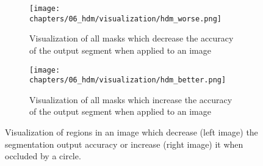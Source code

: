 \begin{figure}[H]
    \centering
    \begin{subfigure}{.48\textwidth}
        \centering
        \texttt{[image: chapters/06\_hdm/visualization/hdm\_worse.png]}
        \caption{Visualization of all masks which decrease the accuracy of the output segment when applied to an image}
    \end{subfigure}\hfill%
    \begin{subfigure}{.48\textwidth}
        \centering
        \texttt{[image: chapters/06\_hdm/visualization/hdm\_better.png]}
        \caption{Visualization of all masks which increase the accuracy of the output segment when applied to an image}
    \end{subfigure}
    \caption{Visualization of regions in an image which decrease (left image) the segmentation output accuracy or increase (right image) it when occluded by a circle.}
    \label{hdm_visualization_better_worsebetter}
\end{figure}
